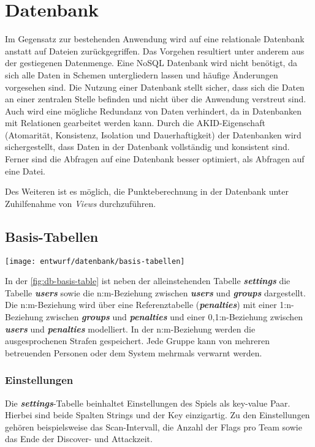 \section{Datenbank}
\label{sec:Entwurf-Datenbank}
Im Gegensatz zur bestehenden Anwendung wird auf eine relationale Datenbank anstatt auf Dateien zurückgegriffen. Das Vorgehen resultiert unter anderem aus der gestiegenen Datenmenge. Eine NoSQL Datenbank wird nicht benötigt, da sich alle Daten in Schemen untergliedern lassen und häufige Änderungen vorgesehen sind. Die Nutzung einer Datenbank stellt sicher, dass sich die Daten an einer zentralen Stelle befinden und nicht über die Anwendung verstreut sind. Auch wird eine mögliche Redundanz von Daten verhindert, da in Datenbanken mit Relationen gearbeitet werden kann. Durch die AKID-Eigenschaft (Atomarität, Konsistenz, Isolation und Dauerhaftigkeit) der Datenbanken wird sichergestellt, dass Daten in der Datenbank vollständig und konsistent sind. Ferner sind die Abfragen auf eine Datenbank besser optimiert, als Abfragen auf eine Datei. \cite{drillingWasIstDatenbank2017}

Des Weiteren ist es möglich, die Punkteberechnung in der Datenbank unter Zuhilfenahme von \textit{Views} durchzuführen.

\subsection{Basis-Tabellen}
\begin{center}
	\texttt{[image: entwurf/datenbank/basis-tabellen]}
	\label{fig:db-basis-table}
\end{center}

In der \autoref{fig:db-basis-table} ist neben der alleinstehenden Tabelle \textbf{\textit{settings}} die Tabelle \textbf{\textit{users}} sowie die n:m-Beziehung  zwischen \textbf{\textit{users}} und \textbf{\textit{groups}} dargestellt. Die  n:m-Beziehung wird über eine Referenztabelle (\textbf{\textit{penalties}}) mit einer 1:n-Beziehung zwischen \textbf{\textit{groups}} und \textbf{\textit{penalties}} und einer 0,1:n-Beziehung zwischen \textbf{\textit{users}} und \textbf{\textit{penalties}} modelliert. In der n:m-Beziehung werden die ausgesprochenen Strafen gespeichert. Jede Gruppe kann von mehreren betreuenden Personen oder dem System mehrmals verwarnt werden.

\subsubsection{Einstellungen}
Die \textbf{\textit{settings}}-Tabelle beinhaltet Einstellungen des Spiels als key-value Paar. Hierbei sind beide Spalten Strings und der Key einzigartig. Zu den Einstellungen gehören beispielsweise das Scan-Intervall, die Anzahl der Flags pro Team sowie das Ende der Discover- und Attackzeit.

